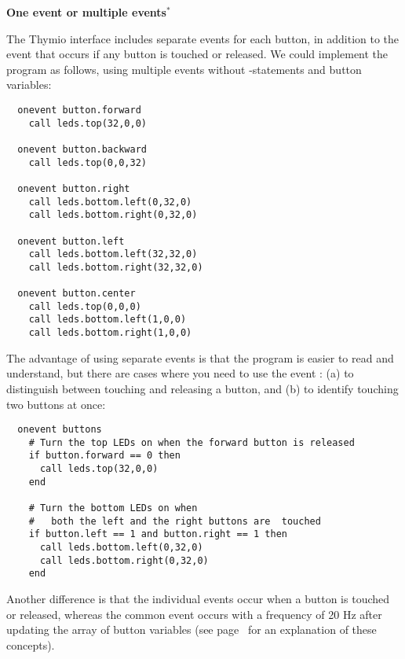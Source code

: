 \textbf{\large One event or multiple events$^*$}

The Thymio interface includes separate events for each button, in
addition to the  event that occurs if any button is touched
or released. We could implement the program as follows, using multiple
events without -statements and button variables:

\begin{footnotesize}
\begin{verbatim}
  onevent button.forward
    call leds.top(32,0,0)
  
  onevent button.backward
    call leds.top(0,0,32)
  
  onevent button.right
    call leds.bottom.left(0,32,0)
    call leds.bottom.right(0,32,0)
  
  onevent button.left
    call leds.bottom.left(32,32,0)
    call leds.bottom.right(32,32,0)
  
  onevent button.center
    call leds.top(0,0,0)
    call leds.bottom.left(1,0,0)
    call leds.bottom.right(1,0,0)
\end{verbatim}
\end{footnotesize}

The advantage of using separate events is that the program is easier to
read and understand, but there are cases where you need to use the event
: (a) to distinguish between touching and releasing a button,
and (b) to identify touching two buttons at once:

\begin{footnotesize}
\begin{verbatim}
  onevent buttons
    # Turn the top LEDs on when the forward button is released
    if button.forward == 0 then
      call leds.top(32,0,0)
    end

    # Turn the bottom LEDs on when
    #   both the left and the right buttons are  touched
    if button.left == 1 and button.right == 1 then
      call leds.bottom.left(0,32,0)
      call leds.bottom.right(0,32,0)
    end
\end{verbatim}
\end{footnotesize}


Another difference is that the individual events occur when a button is
touched or released, whereas the common event  occurs with a
frequency of 20 Hz after updating the array of button variables (see
page~\pageref{pg.hz} for an explanation of these concepts).



